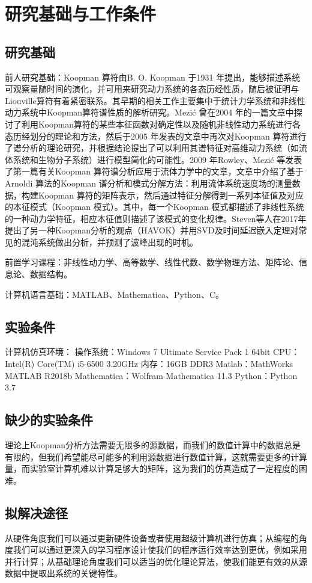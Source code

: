 \section{研究基础与工作条件}
\subsection{研究基础}
前人研究基础：Koopman 算符由B. O. Koopman 于1931 年提出，能够描述系统可观察量随时间的演化，并可用来研究动力系统的各态历经性质，随后被证明与Liouville算符有着紧密联系。其早期的相关工作主要集中于统计力学系统和非线性动力系统中Koopman算符谱性质的解析研究。Mezić 曾在2004 年的一篇文章中探讨了利用Koopman算符的某些本征函数对确定性以及随机非线性动力系统进行各态历经划分的理论和方法，然后于2005 年发表的文章中再次对Koopman 算符进行了谱分析的理论研究，并根据结论提出了可以利用其谱特征对高维动力系统（如流体系统和生物分子系统）进行模型简化的可能性。2009 年Rowley、Mezić 等发表了第一篇有关Koopman 算符谱分析应用于流体力学中的文章，文章中介绍了基于Arnoldi 算法的Koopman 谱分析和模式分解方法：利用流体系统速度场的测量数据，构建Koopman 算符的矩阵表示，然后通过特征分解得到一系列本征值及对应的本征模式（Koopman 模式）。其中，每一个Koopman 模式都描述了非线性系统的一种动力学特征，相应本征值则描述了该模式的变化规律。Steven等人在2017年提出了另一种Koopman分析的观点（HAVOK）并用SVD及时间延迟嵌入定理对常见的混沌系统做出分析，并预测了波峰出现的时机。

前置学习课程：非线性动力学、高等数学、线性代数、数学物理方法、矩阵论、信息论、数据结构。

计算机语言基础：MATLAB、Mathematica、Python、C。
\subsection{实验条件}
计算机仿真环境：
操作系统：Windows 7 Ultimate Service Pack 1 64bit
CPU：Intel(R) Core(TM) i5-6500 3.20GHz
内存：16GB DDR3
Matlab：MathWorks MATLAB R2018b
Mathematica：Wolfram Mathematica 11.3
Python：Python 3.7

\subsection{缺少的实验条件}
理论上Koopman分析方法需要无限多的源数据，而我们的数值计算中的数据总是有限的，但我们希望能尽可能多的利用源数据进行数值计算，这就需要更多的计算量，而实验室计算机难以计算足够大的矩阵，这为我们的仿真造成了一定程度的困难。

\subsection{拟解决途径}
从硬件角度我们可以通过更新硬件设备或者使用超级计算机进行仿真；从编程的角度我们可以通过更深入的学习程序设计使我们的程序运行效率达到更优，例如采用并行计算；从基础理论角度我们可以适当的优化理论算法，使我们能更有效的从源数据中提取出系统的关键特性。

% 
% 
